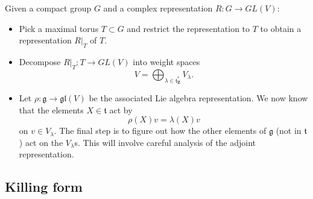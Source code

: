 \documentclass[12pt]{article}
\newcommand{\ZZ}{\mathbf{Z}}
\theoremstyle{definition}
\theoremstyle{check}
\theoremstyle{remark}
\theoremstyle{TheoremNum}
\begin{document}
Given a compact group $G$ and a complex representation $R\colon G\to GL(V)$:
\begin{itemize}
\item Pick a maximal torus $T\subset G$ and restrict the representation to $T$ to obtain a representation $R|_T$ of $T$.
\item Decompose $R|_T\colon T\to GL(V)$ into weight spaces
\[V=\bigoplus_{\lambda\in\mathfrak{t}^*_{\ZZ}}V_{\lambda}.\]
\item Let $\rho\colon\mathfrak{g}\to\mathfrak{gl}(V)$ be the associated Lie algebra representation. We now know that the elements $X\in\mathfrak{t}$ act by
\[\rho(X)v=\lambda(X)v\]
on $v\in V_{\lambda}$. The final step is to figure out how the other elements of $\mathfrak{g}$ (not in $\mathfrak{t}$) act on the $V_{\lambda}$s. This will involve careful analysis of the adjoint representation.
\end{itemize}




\subsection{Killing form}
\end{document}
